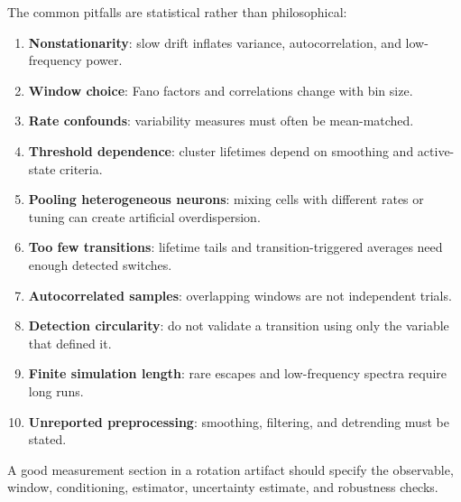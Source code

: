 The common pitfalls are statistical rather than philosophical:
\begin{enumerate}[leftmargin=*]
  \item \textbf{Nonstationarity}: slow drift inflates variance, autocorrelation, and low-frequency power.
  \item \textbf{Window choice}: Fano factors and correlations change with bin size.
  \item \textbf{Rate confounds}: variability measures must often be mean-matched.
  \item \textbf{Threshold dependence}: cluster lifetimes depend on smoothing and active-state criteria.
  \item \textbf{Pooling heterogeneous neurons}: mixing cells with different rates or tuning can create artificial overdispersion.
  \item \textbf{Too few transitions}: lifetime tails and transition-triggered averages need enough detected switches.
  \item \textbf{Autocorrelated samples}: overlapping windows are not independent trials.
  \item \textbf{Detection circularity}: do not validate a transition using only the variable that defined it.
  \item \textbf{Finite simulation length}: rare escapes and low-frequency spectra require long runs.
  \item \textbf{Unreported preprocessing}: smoothing, filtering, and detrending must be stated.
\end{enumerate}

A good measurement section in a rotation artifact should specify the observable, window, conditioning, estimator, uncertainty estimate, and robustness checks.

